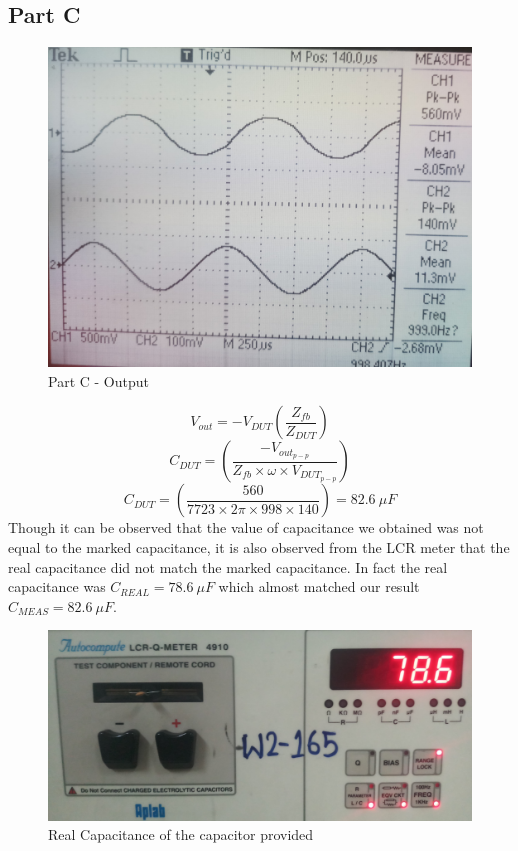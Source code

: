 \documentclass[12pt]{article}
\begin{document}
\subsection{Part C}
\begin{figure}[H]
	\centering
	\includegraphics[scale=0.08]{PartC.jpg}
	\caption{Part C - Output}
\end{figure}
\[ V_{out} = -V_{DUT}\left( \frac{Z_{fb}}{Z_{DUT}} \right) \] \[ C_{DUT} = \left( \frac{- V_{out_{p-p}}}{Z_{fb} \times \omega \times V_{DUT_{p-p}}} \right) \] \[ C_{DUT} = \left(  \frac{560}{7723 \times 2 \pi \times 998 \times 140} \right) = 82.6\ \mu F \] 
Though it can be observed that the value of capacitance we obtained was not equal to the marked capacitance, it is also observed from the LCR meter that the real capacitance did not match the marked capacitance. In fact the real capacitance was \( C_{REAL} = 78.6\ \mu F \) which almost matched our result \( C_{MEAS} = 82.6\ \mu F \).
\begin{figure}[H]
	\centering
	\includegraphics[scale=0.055]{RealCapacitance.jpg}
	\caption{Real Capacitance of the capacitor provided}
\end{figure}
\end{document}
